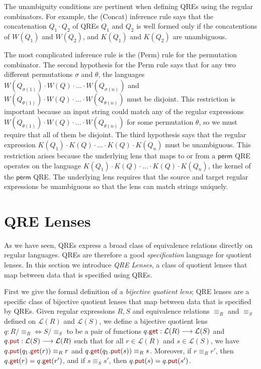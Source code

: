 \documentclass[acmsmall,review,anonymous]{acmart}
\newcommand{\kw}[1]{\textcolor{dkred}{\ensuremath{\mathsf{#1}}}}
\newcommand{\get}{\ensuremath{\kw{get}}}
\newcommand{\lput}{\ensuremath{\kw{put}}}
\begin{document}
The unambiguity conditions are pertinent when defining QREs using the
regular combinators. For example, the (Concat) inference rule 
says that the concatenation $Q_1 \cdot Q_2$ of QREs
$Q_1$ and $Q_2$ is well formed only if the concatentions of $W(Q_1)$
and $W(Q_2)$, and $K(Q_1)$ and $K(Q_2)$ are unambiguous.

The most complicated inference rule is the (Perm) rule for the
permutation combinator. The second hypothesis for the
Perm rule says that for any two different permutations $\sigma$
and $\theta$, the languages $W(Q_{\sigma(1)}) \cdot W(Q) \cdot \ldots \cdot
W(Q_{\sigma(n)})$ and $W(Q_{\theta(1)}) \cdot W(Q) \cdot \ldots \cdot
W(Q_{\theta(n)})$ must be disjoint. This restriction is important
because an input string could match any
of the regular expressions $W(Q_{\theta(1)}) \cdot
W(Q) \cdot \ldots \cdot W(Q_{\theta(n)})$ for some permutation $\theta$, so we
must require that all of them be disjoint.
%
The third hypothesis says that the regular expression $K(Q_1) \cdot K(Q)
\cdot \ldots \cdot K(Q) \cdot K(Q_n)$ must be unambiguous. This
restriction arises because the
underlying lens that maps to or from a \kw{perm} QRE operates on
the language $K(Q_1) \cdot K(Q) \cdot \ldots \cdot K(Q) \cdot K(Q_n)$, 
the kernel of the \kw{perm} QRE. The underlying
lens requires that the source and target regular expressions be
unambiguous so that the lens can match strings uniquely.


\section{QRE Lenses}
\label{QRE-lenses}
As we have seen, QREs express a broad class of equivalence relations
directly on regular languages. QREs are therefore a good \textit{specification}
language for quotient lenses. In this section we introduce \textit{QRE Lenses},
a class of quotient lenses that map between data that is specified using QREs.

First we give the formal definition of a {\em bijective quotient lens}; QRE
lenses are a specific class of bijective quotient lenses that map between data
that is specified by QREs. Given regular expressions $R, S$ and equivalence
relations $\equiv_R$ and $\equiv_S$ defined on $\mathcal{L}(R)$ and $\mathcal{L}(S)$,
we define a bijective quotient lens $q : R /{\equiv_R} \Leftrightarrow
S/{\equiv_S}$ to be a pair of functions $q.\get :
\mathcal{L}(R) \longrightarrow \mathcal{L}(S)$ and $q.\lput : \mathcal{L}(S)
\longrightarrow \mathcal{L}(R)$ such that for all $r \in \mathcal{L}(R)$ and $s
\in \mathcal{L}(S)$, we have $q.\lput(q_1.\get(r)) \equiv_R r$ and
$q.\get(q_1.\lput(s)) \equiv_R s$. Moreover, if $r \equiv_R r'$, then $q.\get(r) =
q.\get(r')$, and if $s \equiv_S s'$, then $q.\lput(s) = q.\lput(s')$.
\end{document}

